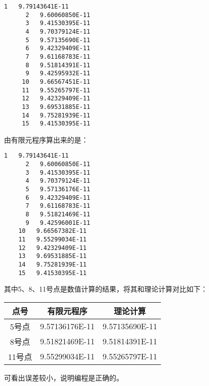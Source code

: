 \documentclass[hyperref,UTF-8]{ctexart}
\begin{document}
\begin{Verbatim}[commandchars=\\\{\},fontsize=\small]
      1   9.79143641E-11
      2   9.60060850E-11
      3   9.41530395E-11
      4   9.70379124E-11
      5   9.57135690E-11
      6   9.42329409E-11
      7   9.61168783E-11
      8   9.51814391E-11
      9   9.42595932E-11
     10   9.66567451E-11
     11   9.55265797E-11
     12   9.42329409E-11
     13   9.69531885E-11
     14   9.75281939E-11
     15   9.41530395E-11
\end{Verbatim}

由有限元程序算出来的是：

\begin{Verbatim}[commandchars=\\\{\},fontsize=\small]
      1   9.79143641E-11
      2   9.60060850E-11
      3   9.41530395E-11
      4   9.70379124E-11
      5   9.57136176E-11
      6   9.42329409E-11
      7   9.61168783E-11
      8   9.51821469E-11
      9   9.42596001E-11
    10   9.66567382E-11
    11   9.55299034E-11
    12   9.42329409E-11
    13   9.69531885E-11
    14   9.75281939E-11
    15   9.41530395E-11
\end{Verbatim}

其中5、8、11号点是数值计算的结果，将其和理论计算对比如下：

\begin{center}
\renewcommand\arraystretch{2}
\begin{tabular}{c|c|c}\hline
点号&有限元程序&理论计算\\\hline
5号点& 9.57136176E-11& 9.57135690E-11\\\hline
8号点&9.51821469E-11&9.51814391E-11\\\hline
11号点&9.55299034E-11& 9.55265797E-11\\\hline
\end{tabular}
\end{center}

可看出误差较小，说明编程是正确的。
\end{document}
